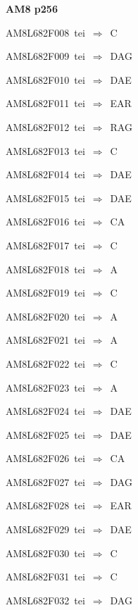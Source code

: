 \par\vfill\eject
{\bf\hfill AM8 p256\hfill\hbox{}}\par\bigskip
{\sixrm AM8L682F008\ {\sixit tei}\ }$\Rightarrow$\ {\tenit C}\par\smallskip
{\sixrm AM8L682F009\ {\sixit tei}\ }$\Rightarrow$\ DAG\par\smallskip
{\sixrm AM8L682F010\ {\sixit tei}\ }$\Rightarrow$\ DAE\par\smallskip
{\sixrm AM8L682F011\ {\sixit tei}\ }$\Rightarrow$\ EAR\par\smallskip
{\sixrm AM8L682F012\ {\sixit tei}\ }$\Rightarrow$\ RAG\par\smallskip
{\sixrm AM8L682F013\ {\sixit tei}\ }$\Rightarrow$\ C\par\smallskip
{\sixrm AM8L682F014\ {\sixit tei}\ }$\Rightarrow$\ DAE\par\smallskip
{\sixrm AM8L682F015\ {\sixit tei}\ }$\Rightarrow$\ DAE\par\smallskip
{\sixrm AM8L682F016\ {\sixit tei}\ }$\Rightarrow$\ CA\par\smallskip
{\sixrm AM8L682F017\ {\sixit tei}\ }$\Rightarrow$\ C\par\smallskip
{\sixrm AM8L682F018\ {\sixit tei}\ }$\Rightarrow$\ A\par\smallskip
{\sixrm AM8L682F019\ {\sixit tei}\ }$\Rightarrow$\ C\par\smallskip
{\sixrm AM8L682F020\ {\sixit tei}\ }$\Rightarrow$\ A\par\smallskip
{\sixrm AM8L682F021\ {\sixit tei}\ }$\Rightarrow$\ A\par\smallskip
{\sixrm AM8L682F022\ {\sixit tei}\ }$\Rightarrow$\ C\par\smallskip
{\sixrm AM8L682F023\ {\sixit tei}\ }$\Rightarrow$\ A\par\smallskip
{\sixrm AM8L682F024\ {\sixit tei}\ }$\Rightarrow$\ DAE\par\smallskip
{\sixrm AM8L682F025\ {\sixit tei}\ }$\Rightarrow$\ DAE\par\smallskip
{\sixrm AM8L682F026\ {\sixit tei}\ }$\Rightarrow$\ CA\par\smallskip
{\sixrm AM8L682F027\ {\sixit tei}\ }$\Rightarrow$\ DAG\par\smallskip
{\sixrm AM8L682F028\ {\sixit tei}\ }$\Rightarrow$\ EAR\par\smallskip
{\sixrm AM8L682F029\ {\sixit tei}\ }$\Rightarrow$\ DAE\par\smallskip
{\sixrm AM8L682F030\ {\sixit tei}\ }$\Rightarrow$\ C\par\smallskip
{\sixrm AM8L682F031\ {\sixit tei}\ }$\Rightarrow$\ C\par\smallskip
{\sixrm AM8L682F032\ {\sixit tei}\ }$\Rightarrow$\ DAG\par\smallskip

